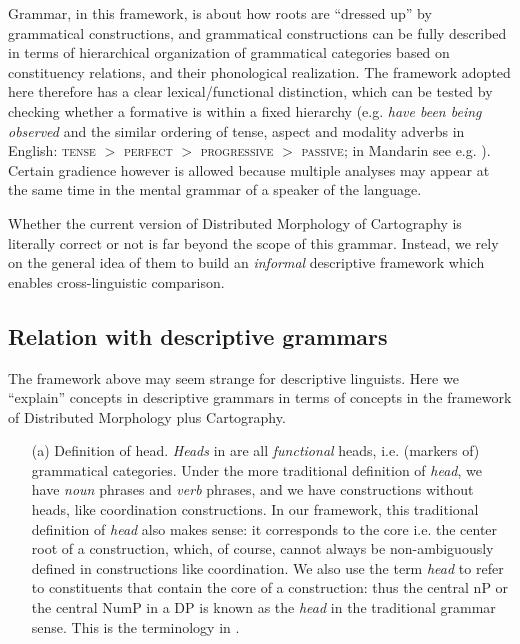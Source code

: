 \documentclass[UTF8, a4paper, oneside, scheme=plain, 12pt]{ctexrep}
\newcommand*{\textgt}{$>$ }
\newcommand*{\term}[1]{\emph{#1}}
\newcommand{\form}[1]{\emph{#1}}
\newcommand*{\category}[1]{\textsc{#1}}
\begin{document}
{Grammar, in this framework, is about how roots are ``dressed up'' by grammatical constructions,
and grammatical constructions can be fully described
in terms of hierarchical organization of grammatical categories based on constituency relations, and their phonological realization.
The framework adopted here therefore has a clear lexical/functional distinction,
which can be tested by checking whether a formative is within a fixed hierarchy 
(e.g. \form{have been being observed} and the similar ordering of tense, aspect and modality adverbs in English: \category{tense} \textgt{}\category{perfect} \textgt{}\category{progressive} \textgt{}\category{passive}; 
in Mandarin see e.g. ).
Certain gradience however is allowed because multiple analyses may appear at the same time
in the mental grammar of a speaker of the language.

Whether the current version of Distributed Morphology of Cartography is literally correct or not 
is far beyond the scope of this grammar.
Instead, we rely on the general idea of them to build an \emph{informal} descriptive framework
which enables cross-linguistic comparison.

\subsection{Relation with descriptive grammars}\label{sec:theory.descriptive}

The framework above may seem strange for descriptive linguists.
Here we ``explain'' concepts in descriptive grammars in terms of concepts in the framework
of Distributed Morphology plus Cartography.

\begin{itemize}
    \item[(a)] Definition of head. \term{Heads} in  are all \emph{functional} heads,
    i.e. (markers of) grammatical categories.
    Under the more traditional definition of \term{head},
    we have \emph{noun} phrases and \emph{verb} phrases,
    and we have constructions without heads, like coordination constructions.
    In our framework, this traditional definition of \term{head} also makes sense:
    it corresponds to the core i.e. the center root of a construction,
    which, of course, cannot always be non-ambiguously defined in constructions like coordination.
    We also use the term \term{head} to refer to constituents that contain the core of a construction:
    thus the central nP or the central NumP in a DP is known as the \term{head} in the traditional grammar sense.
    This is the terminology in \citet{cgel}.


\end{itemize}}
\end{document}

